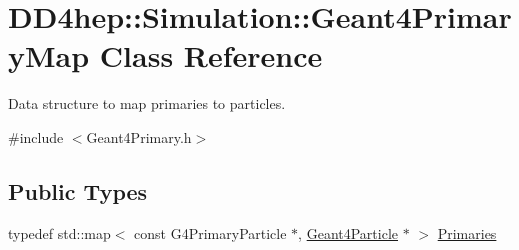 \hypertarget{class_d_d4hep_1_1_simulation_1_1_geant4_primary_map}{
\section{DD4hep::Simulation::Geant4PrimaryMap Class Reference}
\label{class_d_d4hep_1_1_simulation_1_1_geant4_primary_map}
}


Data structure to map primaries to particles.  


{\ttfamily \#include $<$Geant4Primary.h$>$}\subsection*{Public Types}
\begin{DoxyCompactItemize}
\item 
typedef std::map$<$ const G4PrimaryParticle $\ast$, \hyperlink{class_d_d4hep_1_1_simulation_1_1_geant4_particle}{Geant4Particle} $\ast$ $>$ \hyperlink{class_d_d4hep_1_1_simulation_1_1_geant4_primary_map_aec80e9bb254e582ef410dc65da5809c3}{Primaries}
\end{DoxyCompactItemize}

